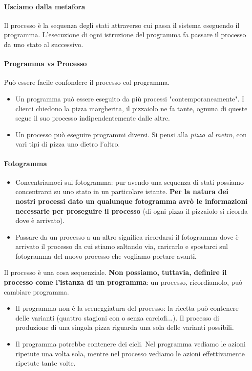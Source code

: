 \paragraph{Usciamo dalla metafora} Il processo è la sequenza degli stati attraverso cui passa il sistema eseguendo il programma. L'esecuzione di ogni istruzione del programma fa passare il processo da uno stato al successivo.
\paragraph{Programma vs Processo} Può essere facile confondere il processo col programma.
\begin{itemize}
	\item Un programma può essere eseguito da più processi "contemporaneamente". I clienti chiedono la pizza margherita, il pizzaiolo ne fa tante, ognuna di queste segue il suo processo indipendentemente dalle altre. 
	\item Un processo può eseguire programmi diversi. Si pensi alla \emph{pizza al metro}, con vari tipi di pizza uno dietro l'altro.
\end{itemize}
\paragraph{Fotogramma} 
\begin{itemize}
	\item Concentriamoci sul fotogramma: pur avendo una sequenza di stati possiamo concentrarci su uno stato in un particolare istante. \textbf{Per la natura dei nostri processi dato un qualunque fotogramma avrò le informazioni necessarie per proseguire il processo} (di ogni pizza il pizzaiolo si ricorda dove è arrivato).
	\item Passare da un processo a un altro significa ricordarsi il fotogramma dove è arrivato il processo da cui stiamo saltando via, caricarlo e spostarci sul fotogramma del nuovo processo che vogliamo portare avanti.
\end{itemize} Il processo è una cosa sequenziale. \textbf{Non possiamo, tuttavia, definire il processo come l'istanza di un programma}: un processo, ricordiamolo, può cambiare programma. 
\begin{itemize}
	\item  Il programma non è la sceneggiatura del processo: la ricetta può contenere delle varianti (quattro stagioni con o senza carciofi...). Il processo di produzione di una singola pizza riguarda una sola delle varianti possibili.
	\item Il programma potrebbe contenere dei cicli. Nel programma vediamo le azioni ripetute una volta sola, mentre nel processo vediamo le azioni effettivamente ripetute tante volte.
\end{itemize}

